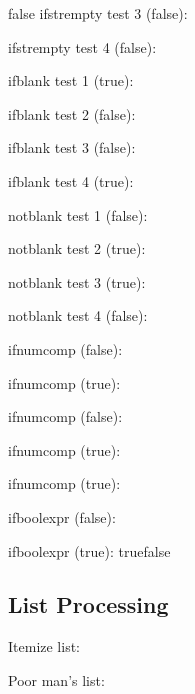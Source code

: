 \documentclass{article}
\begin{document}
\begin{true}{false}
ifstrempty test 3 (false): 

ifstrempty test 4 (false): 

ifblank test 1 (true): 

ifblank test 2 (false): 

ifblank test 3 (false): 

ifblank test 4 (true): 

notblank test 1 (false): 

notblank test 2 (true): 

notblank test 3 (true): 

notblank test 4 (false): 


ifnumcomp (false): 

ifnumcomp (true): 

ifnumcomp (false): 

\setcounter{countA}{6}
\setcounter{countB}{5}

ifnumcomp (true): 

ifnumcomp (true): 


ifboolexpr (false): 

ifboolexpr (true): 
{true}{false}

\subsection{List Processing}

\noindent Itemize list:
\begin{itemize}
	\renewcommand*{\do}[1]{\item #1}
\end{itemize}

\renewcommand*{\do}[1]{\indent * #1\newline}
\noindent Poor man's list:\newline
{}


\end{true}
\end{document}
